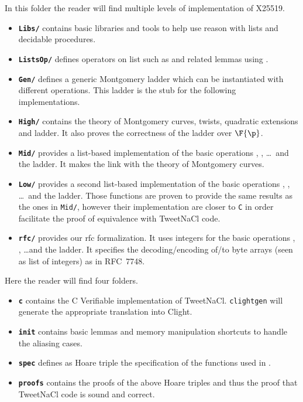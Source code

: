 In this folder the reader will find multiple levels of implementation of X25519.
\begin{itemize}
  \item \textbf{\texttt{Libs/}} contains basic libraries and tools to help use
  reason with lists and decidable procedures.
  \item \textbf{\texttt{ListsOp/}} defines operators on list such as
   and related lemmas using \eg {}.
  \item \textbf{\texttt{Gen/}} defines a generic Montgomery ladder which can be
  instantiated with different operations. This ladder is the stub for the
  following implementations.
  \item \textbf{\texttt{High/}} contains the theory of Montgomery curves,
  twists, quadratic extensions and ladder.
  It also proves the correctness of the ladder over $\F{\p}$.
  \item \textbf{\texttt{Mid/}} provides a list-based implementation of the
  basic operations , ,  \ldots~and the ladder. It
  makes the link with the theory of Montgomery curves.
  \item \textbf{\texttt{Low/}} provides a second list-based implementation of
  the basic operations , ,  \ldots~and the ladder.
  Those functions are proven to provide the same results as the ones in
  \texttt{Mid/}, however their implementation are closer to \texttt{C} in order
  facilitate the proof of equivalence with TweetNaCl code.
  \item \textbf{\texttt{rfc/}} provides our rfc formalization.
  It uses integers for the basic operations , , 
  \ldots and the ladder. It specifies the decoding/encoding of/to byte
  arrays (seen as list of integers) as in RFC~7748.
\end{itemize}

Here the reader will find four folders.
\begin{itemize}
  \item \textbf{\texttt{c}} contains the C Verifiable implementation of TweetNaCl.
  \texttt{clightgen} will generate the appropriate translation into Clight.
  \item \textbf{\texttt{init}} contains basic lemmas and memory manipulation
  shortcuts to handle the aliasing cases.
  \item \textbf{\texttt{spec}} defines as Hoare triple the specification of the
  functions used in .
  \item \textbf{\texttt{proofs}} contains the proofs of the above Hoare triples
  and thus the proof that TweetNaCl code is sound and correct.
\end{itemize}

